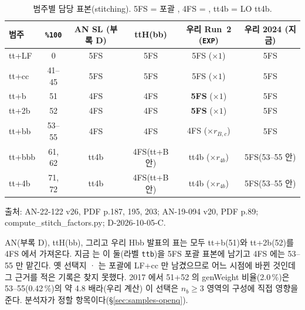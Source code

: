 \begin{table}[htbp]
\centering
\caption{범주별 담당 표본(stitching). 5FS = 포괄 \ttbar, 4FS = \ttbb, tt4b = LO tt4b.}
\label{tab:samples-owner}
\footnotesize
\begin{tabularx}{\textwidth}{l c C C C C}
\toprule
범주 & \texttt{\%100} & AN SL (부록 D) & ttH(bb) & 우리 Run~2 (\texttt{EXP}) & 우리 2024 (지금) \\
\midrule
tt+LF  & 0      & 5FS & 5FS & 5FS ($\times1$) & 5FS \\
tt+cc  & 41--45 & 5FS & 5FS & 5FS ($\times1$) & 5FS \\
tt+b   & 51     & 4FS & 4FS & \textbf{5FS} ($\times1$) & 5FS \\
tt+2b  & 52     & 4FS & 4FS & \textbf{5FS} ($\times1$) & 5FS \\
tt+bb  & 53--55 & 4FS & 4FS & 4FS ($\times r_{B,c}$) & 5FS \\
tt+bbb & 61, 62 & tt4b & 4FS(tt+B 안) & tt4b ($\times r_{4b}$) & 5FS(53--55 안) \\
tt+4b  & 71, 72 & tt4b & 4FS(tt+B 안) & tt4b ($\times r_{4b}$) & 5FS(53--55 안) \\
\bottomrule
\end{tabularx}
\par\smallskip\footnotesize 출처: AN-22-122 v26, PDF p.187, 195, 203; AN-19-094 v20, PDF p.89; compute\_stitch\_factors.py; D-2026-10-05-C.
\end{table}

\begin{andiff}
AN(부록 D), ttH(bb), 그리고 우리 Hbb 발표의 표는 모두 tt+b(51)와 tt+2b(52)를 4FS \ttbb 에서 가져온다. 지금  는 이 둘(라벨 \texttt{ttb})을 5FS 포괄 표본에
남기고 4FS 에는 53--55 만 맡긴다. 옛 선택지 · 는 포괄에 LF+cc 만 남겼으므로
어느 시점에 바뀐 것인데 그 근거를 적은 기록은 찾지 못했다. 2017  에서 51+52 의 genWeight 비율(2.0\,\%)은 53--55(0.42\,\%)의 약 4.8 배라(우리 계산)
 이 선택은 $n_b\geq3$ 영역의 \ttbar 구성에 직접 영향을 준다. 분석자가 정할 항목이다(\S\ref{sec:samples-openq}).
\end{andiff}

